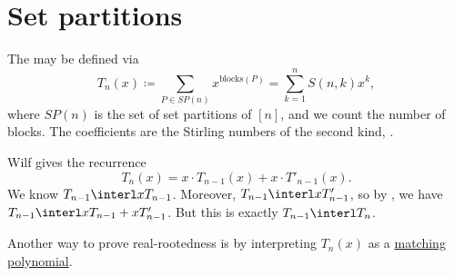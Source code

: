 


\section[sturmSetPartitions]{Set partitions}



\begin{example*}\label{touchardPolynomial}

The \label{touchardPolynomialDefinition}
may be defined via
\[
T_n(x) \coloneqq \sum_{P \in SP(n)} x^{\mathrm{blocks}(P)}
= \sum_{k=1}^n S(n,k) x^k,
\]
where $SP(n)$ is the set of set partitions of $[n]$, and we count the number
of blocks.
The coefficients are the Stirling numbers of the second kind,
.

Wilf gives the recurrence \cite[pp.~20, 139]{Wilf1994}
\[
  T_n(x) = x \cdot  T_{n-1}(x) + x\cdot T'_{n-1}(x).
\]
We know $T_{n-1} \interl x T_{n-1}$. Moreover, $T_{n-1} \interl x T'_{n-1}$,
so by \cite{Wagner1992}, we have $T_{n-1} \interl x T_{n-1} +  x T'_{n-1}$.
But this is exactly $T_{n-1} \interl T_n$.

Another way to prove real-rootedness is by interpreting \(T_n(x)\) as a
\hyperref[touchardAsMatching]{matching polynomial}.
\end{example*}


